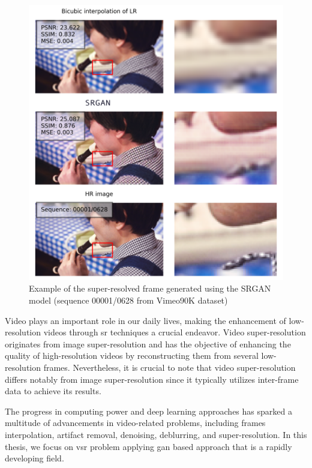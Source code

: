 \documentclass[conference]{IEEEtran}
\begin{document}
\begin{figure}[t]
	\centering
	\includegraphics[scale=1.5]{results/crop_00001_0628}
	\caption{Example of the super-resolved frame generated using the SRGAN model (sequence 00001/0628 from Vimeo90K dataset)}
	\label{fig:example_sr_conclusion}
\end{figure}

Video plays an important role in our daily lives, making the enhancement of low-resolution videos through \acrshort{sr} techniques a crucial endeavor. Video super-resolution originates from image super-resolution and has the objective of enhancing the quality of high-resolution videos by reconstructing them from several low-resolution frames. Nevertheless, it is crucial to note that video super-resolution differs notably from image super-resolution since it typically utilizes inter-frame data to achieve its results.

The progress in computing power and deep learning approaches has sparked a multitude of advancements in video-related problems, including frames interpolation, artifact removal, denoising, deblurring, and super-resolution. In this thesis, we focus on \acrshort{vsr} problem applying \acrshort{gan} based approach that is a rapidly developing field.
\end{document}
